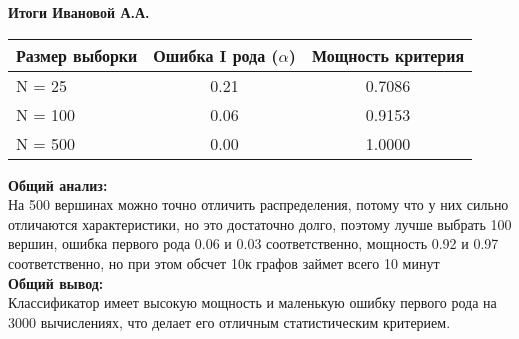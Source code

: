 
\noindent \textbf{Итоги Ивановой А.А.}

\begin{table}[h]
\centering
\begin{tabular}{lcc}
\toprule
\textbf{Размер выборки} & \textbf{Ошибка I рода ($\alpha$)} & \textbf{Мощность критерия} \\
\midrule
N = 25   & 0.21 & 0.7086 \\
N = 100  & 0.06 & 0.9153 \\
N = 500  & 0.00 & 1.0000 \\
\bottomrule
\end{tabular}
\label{tab:power_analysis}
\end{table}

\noindent \textbf{Общий анализ:}\\
На 500 вершинах можно точно отличить распределения, потому что у них сильно отличаются характеристики, но это достаточно долго, поэтому лучше выбрать 100 вершин, ошибка первого рода 0.06 и 0.03 соответственно, мощность 0.92 и 0.97 соответственно, но при этом обсчет 10к графов займет всего 10 минут\\

\noindent \textbf{Общий вывод:}\\
Классификатор имеет высокую мощность и маленькую ошибку первого рода на 3000 вычислениях, что делает его отличным статистическим критерием.
\noindent